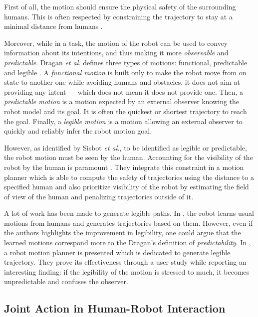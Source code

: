 \documentclass[a4paper,11pt,twoside]{StyleThese}
\begin{document}
First of all, the motion should ensure the physical safety of the surrounding humans. This is often respected by constraining the trajectory to stay at a minimal distance from humans \cite{kruse_human-aware_2013, rios2015proxemics}.

Moreover, while in a task, the motion of the robot can be used to convey information about its intentions, and thus making it more \textit{observable} and \textit{predictable}. Dragan \textit{et al.} defines three types of motions: functional, predictable and legible \cite{dragan2015effects}. A \textit{functional motion} is built only to make the robot move from on state to another one while avoiding humans and obstacles, it does not aim at providing any intent --- which does not mean it does not provide one. Then, a \textit{predictable motion} is a motion expected by an external observer knowing the robot model and its goal. It is often the quickest or shortest trajectory to reach the goal. Finally, a \textit{legible motion} is a motion allowing an external observer to quickly and reliably infer the robot motion goal.

However, as identified by Sisbot \textit{et al.}, to be identified as legible or predictable, the robot motion must be seen by the human. Accounting for the visibility of the robot by the human is paramount \cite{sisbot_human_2007}.  They integrate this constraint in a motion planner which is able to compute the safety of trajectories using the distance to a specified human and also prioritize visibility of the robot by estimating the field of view of the human and penalizing trajectories outside of it.

A lot of work has been made to generate legible paths. In \cite{beetz2010generality}, the robot learns usual motions from humans and generates trajectories based on them. However, even if the authors highlights the improvement in legibility, one could argue that the learned motions correspond more to the Dragan's definition of \textit{predictability}. In \cite{dragan_legibility_2013}, a robot motion planner is presented which is dedicated to generate legible trajectory. They prove its effectiveness through a user study while reporting an interesting finding: if the legibility of the motion is stressed to much, it becomes unpredictable and confuses the observer.




\subsection{Joint Action in Human-Robot Interaction}
\end{document}
